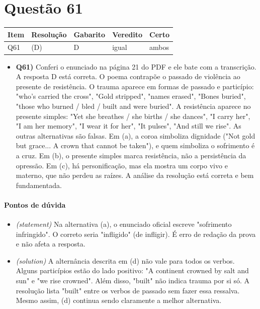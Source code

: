 \documentclass{article}%
\begin{document}
\section*{Questão 61}%
\begin{longtable}{@{}p{} p{} p{} p{} p{}@{}}\toprule Item & Resolução & Gabarito & Veredito & Certo \\ \midrule
Q61 & (D) & D & igual & ambos \\
\bottomrule\end{longtable}%
\begin{itemize}%
\item%
\textbf{Q61)} Conferi o enunciado na página 21 do PDF e ele bate com a transcrição. A resposta D está correta. O poema contrapõe o passado de violência ao presente de resistência. O trauma aparece em formas de passado e particípio: "who's carried the cross", "Gold stripped", "names erased", "Bones buried", "those who burned / bled / built and were buried". A resistência aparece no presente simples: "Yet she breathes / she births / she dances", "I carry her", "I am her memory", "I wear it for her", "It pulses", "And still we rise". As outras alternativas são falsas. Em (a), a coroa simboliza dignidade ("Not gold but grace... A crown that cannot be taken"), e quem simboliza o sofrimento é a cruz. Em (b), o presente simples marca resistência, não a persistência da opressão. Em (c), há personificação, mas ela mostra um corpo vivo e materno, que não perdeu as raízes. A análise da resolução está correta e bem fundamentada.%
\end{itemize}%
\paragraph{Pontos de dúvida}%
\begin{itemize}%
\item%
\textit{(statement)} Na alternativa (a), o enunciado oficial escreve "sofrimento infringido". O correto seria "infligido" (de infligir). É erro de redação da prova e não afeta a resposta.%
\item%
\textit{(solution)} A alternância descrita em (d) não vale para todos os verbos. Alguns particípios estão do lado positivo: "A continent crowned by salt and sun" e "we rise crowned". Além disso, "built" não indica trauma por si só. A resolução lista "built" entre os verbos de passado sem fazer essa ressalva. Mesmo assim, (d) continua sendo claramente a melhor alternativa.%
\end{itemize}%
\end{document}
